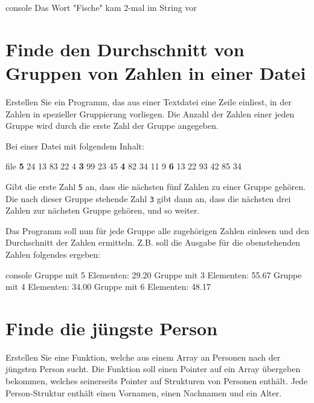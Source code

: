 \begin{mybox}[Bildschirmausgabe]{console}
    Das Wort "Fische" kam 2-mal im String vor
\end{mybox}



\chapter{Finde den Durchschnitt von Gruppen von Zahlen in einer Datei}

\vspace{10pt}

Erstellen Sie ein Programm, das aus einer Textdatei eine Zeile einliest, in der
Zahlen in spezieller Gruppierung vorliegen. Die Anzahl der Zahlen einer jeden
Gruppe wird durch die erste Zahl der Gruppe angegeben.

Bei einer Datei mit folgendem Inhalt:

\begin{mybox}{file}
    \textbf{5} 24 13 83 22 4 \textbf{3} 99 23 45 \textbf{4} 82 34 11 9 \textbf{6} 13 22 93 42 85 34
\end{mybox}

Gibt die erste Zahl \texttt{5} an, dass die nächsten fünf Zahlen zu
einer Gruppe gehören. Die nach dieser Gruppe stehende Zahl \texttt{3}
gibt dann an, dass die nächsten drei Zahlen zur nächsten Gruppe gehören, und so
weiter.

Das Programm soll nun für jede Gruppe alle zugehörigen Zahlen einlesen und den
Durchschnitt der Zahlen ermitteln. Z.B. soll die Ausgabe für die obenstehenden
Zahlen folgendes ergeben:

\begin{mybox}[Bildschirmausgabe]{console}
Gruppe mit 5 Elementen: 29.20
Gruppe mit 3 Elementen: 55.67
Gruppe mit 4 Elementen: 34.00
Gruppe mit 6 Elementen: 48.17
\end{mybox}




\chapter{Finde die jüngste Person}

\vspace{10pt}

Erstellen Sie eine Funktion, welche aus einem Array an Personen nach der
jüngsten Person sucht. Die Funktion soll einen Pointer auf ein Array übergeben
bekommen, welches seinerseits Pointer auf Strukturen von Personen enthält. Jede
Person-Struktur enthält einen Vornamen, einen Nachnamen und ein Alter.

